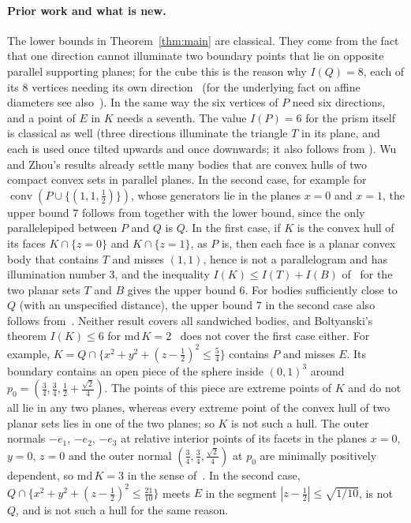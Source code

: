 \documentclass[11pt]{article}
\theoremstyle{definition}
\theoremstyle{remark}
\newcommand{\conv}{\operatorname{conv}}
\begin{document}
\paragraph{Prior work and what is new.} The lower bounds in
Theorem~\ref{thm:main} are classical. They come from the fact that one
direction cannot illuminate two boundary points that lie on opposite parallel
supporting planes; for the cube this is the reason why $I(Q)=8$, each of its
$8$ vertices needing its own direction~\cite[Section~1]{bk} (for the
underlying fact on affine diameters see also~\cite[Lemma~2.1]{wz}). In the same way
the six vertices of $P$ need six directions, and a point of $E$ in $K$ needs a
seventh. The value $I(P)=6$ for the prism itself is classical as well (three
directions illuminate the triangle $T$ in its plane, and each is used once
tilted upwards and once downwards; it also follows from \cite[Theorem~3.5]{wz}).
Wu and Zhou's results already settle many bodies that are convex hulls of two
compact convex sets in parallel planes. In the second case, for example for
$\conv(P\cup\{(1,1,\tfrac12)\})$, whose generators lie in the planes $x=0$ and
$x=1$, the upper bound $7$ follows from \cite[Theorem~3.13]{wz} together with
the lower bound, since the only parallelepiped between $P$ and $Q$ is $Q$. In
the first case, if $K$ is the convex hull of its faces $K\cap\{z=0\}$ and
$K\cap\{z=1\}$, as $P$ is, then each face is a planar convex body that
contains $T$ and misses $(1,1)$, hence is not a parallelogram and has
illumination number $3$, and the inequality $I(K)\le I(T)+I(B)$
of~\cite[Theorem~3.5]{wz} for the two planar sets $T$ and $B$ gives the upper
bound $6$. For bodies sufficiently close to $Q$ (with an unspecified
distance), the upper bound $7$ in the second case also follows
from~\cite[Theorem~1]{lt}. Neither result covers all sandwiched bodies, and
Boltyanski's theorem $I(K)\le6$ for $\mathrm{md}\,K=2$~\cite{bol01} does not
cover the first case either. For example,
$K=Q\cap\{x^2+y^2+(z-\tfrac12)^2\le\tfrac54\}$ contains $P$ and misses $E$.
Its boundary contains an open piece of the sphere inside $(0,1)^3$ around
$p_0=(\tfrac34,\tfrac34,\tfrac12+\tfrac{\sqrt2}{4})$. The points of this piece
are extreme points of $K$ and do not all lie in any two planes, whereas every
extreme point of the convex hull of two planar sets lies in one of the two
planes; so $K$ is not such a hull. The outer normals $-e_1$, $-e_2$, $-e_3$ at
relative interior points of its facets in the planes $x=0$, $y=0$, $z=0$ and
the outer normal $(\tfrac34,\tfrac34,\tfrac{\sqrt2}{4})$ at $p_0$ are
minimally positively dependent, so $\mathrm{md}\,K=3$ in the sense
of~\cite[Section~2.1]{bk}. In the second case,
$Q\cap\{x^2+y^2+(z-\tfrac12)^2\le\tfrac{21}{10}\}$ meets $E$ in the segment
$|z-\tfrac12|\le\sqrt{1/10}$, is not $Q$, and is not such a hull for the same
reason.
\end{document}
